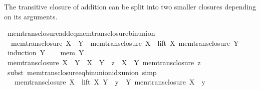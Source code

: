 \begin{isabellebody}
\endisatagproof
{\isafoldproof}%
%
\isadelimproof
%
\endisadelimproof
%
\begin{isamarkuptext}%
The transitive closure of addition can be split into two smaller
closures depending on its arguments.%
\end{isamarkuptext}\isamarkuptrue%
\isamarkupfalse%
\ mem{\isacharunderscore}{\kern0pt}trans{\isacharunderscore}{\kern0pt}closure{\isacharunderscore}{\kern0pt}add{\isacharunderscore}{\kern0pt}eq{\isacharunderscore}{\kern0pt}mem{\isacharunderscore}{\kern0pt}trans{\isacharunderscore}{\kern0pt}closure{\isacharunderscore}{\kern0pt}bin{\isacharunderscore}{\kern0pt}union{\isacharcolon}{\kern0pt}\isanewline
\ \ {\isachardoublequoteopen}mem{\isacharunderscore}{\kern0pt}trans{\isacharunderscore}{\kern0pt}closure\ {\isacharparenleft}{\kern0pt}X\ {\isacharplus}{\kern0pt}\ Y{\isacharparenright}{\kern0pt}\ {\isacharequal}{\kern0pt}\ mem{\isacharunderscore}{\kern0pt}trans{\isacharunderscore}{\kern0pt}closure\ X\ {\isasymunion}\ lift\ X\ {\isacharparenleft}{\kern0pt}mem{\isacharunderscore}{\kern0pt}trans{\isacharunderscore}{\kern0pt}closure\ Y{\isacharparenright}{\kern0pt}{\isachardoublequoteclose}\isanewline
%
\isadelimproof
%
\endisadelimproof
%
\isatagproof
{}\isamarkupfalse%
\ {\isacharparenleft}{\kern0pt}induction\ Y{\isacharparenright}{\kern0pt}\isanewline
\ \ \isamarkupfalse%
\ {\isacharparenleft}{\kern0pt}mem\ Y{\isacharparenright}{\kern0pt}\isanewline
\ \ \isamarkupfalse%
\ {\isachardoublequoteopen}mem{\isacharunderscore}{\kern0pt}trans{\isacharunderscore}{\kern0pt}closure\ {\isacharparenleft}{\kern0pt}X\ {\isacharplus}{\kern0pt}\ Y{\isacharparenright}{\kern0pt}\ {\isacharequal}{\kern0pt}\ {\isacharparenleft}{\kern0pt}X\ {\isacharplus}{\kern0pt}\ Y{\isacharparenright}{\kern0pt}\ {\isasymunion}\ {\isacharparenleft}{\kern0pt}{\isasymUnion}z\ {\isasymin}\ X\ {\isacharplus}{\kern0pt}\ Y{\isachardot}{\kern0pt}\ mem{\isacharunderscore}{\kern0pt}trans{\isacharunderscore}{\kern0pt}closure\ z{\isacharparenright}{\kern0pt}{\isachardoublequoteclose}\isanewline
\ \ \ \ \isamarkupfalse%
\ {\isacharparenleft}{\kern0pt}subst\ mem{\isacharunderscore}{\kern0pt}trans{\isacharunderscore}{\kern0pt}closure{\isacharunderscore}{\kern0pt}eq{\isacharunderscore}{\kern0pt}bin{\isacharunderscore}{\kern0pt}union{\isacharunderscore}{\kern0pt}idx{\isacharunderscore}{\kern0pt}union{\isacharparenright}{\kern0pt}\ simp\isanewline
\ \ \isamarkupfalse%
\ \isamarkupfalse%
\ {\isachardoublequoteopen}{\isachardot}{\kern0pt}{\isachardot}{\kern0pt}{\isachardot}{\kern0pt}\ {\isacharequal}{\kern0pt}\ mem{\isacharunderscore}{\kern0pt}trans{\isacharunderscore}{\kern0pt}closure\ X\ {\isasymunion}\ lift\ X\ Y\ {\isasymunion}\ {\isacharparenleft}{\kern0pt}{\isasymUnion}y\ {\isasymin}\ Y{\isachardot}{\kern0pt}\ mem{\isacharunderscore}{\kern0pt}trans{\isacharunderscore}{\kern0pt}closure\ {\isacharparenleft}{\kern0pt}X\ {\isacharplus}{\kern0pt}\ y{\isacharparenright}{\kern0pt}{\isacharparenright}{\kern0pt}{\isachardoublequoteclose}\isanewline

\end{isabellebody}
